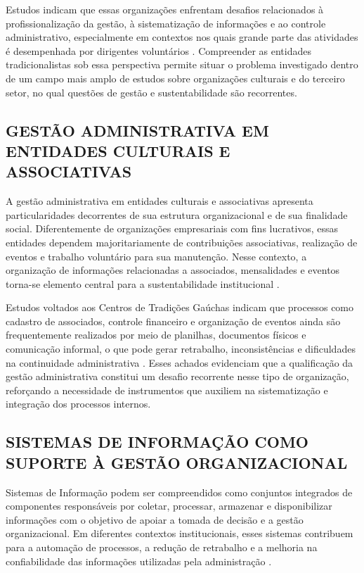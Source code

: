 ﻿\documentclass[12pt,a4paper]{article}
\begin{document}
Estudos indicam que essas organizações enfrentam desafios relacionados à profissionalização da gestão, à sistematização de informações e ao controle administrativo, especialmente em contextos nos quais grande parte das atividades é desempenhada por dirigentes voluntários \citep{fabricio2019,silvaalbarello2024}. Compreender as entidades tradicionalistas sob essa perspectiva permite situar o problema investigado dentro de um campo mais amplo de estudos sobre organizações culturais e do terceiro setor, no qual questões de gestão e sustentabilidade são recorrentes.

\subsection{GESTÃO ADMINISTRATIVA EM ENTIDADES CULTURAIS E ASSOCIATIVAS}

A gestão administrativa em entidades culturais e associativas apresenta particularidades decorrentes de sua estrutura organizacional e de sua finalidade social. Diferentemente de organizações empresariais com fins lucrativos, essas entidades dependem majoritariamente de contribuições associativas, realização de eventos e trabalho voluntário para sua manutenção. Nesse contexto, a organização de informações relacionadas a associados, mensalidades e eventos torna-se elemento central para a sustentabilidade institucional \citep{martini2019}.

Estudos voltados aos Centros de Tradições Gaúchas indicam que processos como cadastro de associados, controle financeiro e organização de eventos ainda são frequentemente realizados por meio de planilhas, documentos físicos e comunicação informal, o que pode gerar retrabalho, inconsistências e dificuldades na continuidade administrativa \citep{jardim2022,silvaalbarello2024}. Esses achados evidenciam que a qualificação da gestão administrativa constitui um desafio recorrente nesse tipo de organização, reforçando a necessidade de instrumentos que auxiliem na sistematização e integração dos processos internos.

\subsection{SISTEMAS DE INFORMAÇÃO COMO SUPORTE À GESTÃO ORGANIZACIONAL}

Sistemas de Informação podem ser compreendidos como conjuntos integrados de componentes responsáveis por coletar, processar, armazenar e disponibilizar informações com o objetivo de apoiar a tomada de decisão e a gestão organizacional. Em diferentes contextos institucionais, esses sistemas contribuem para a automação de processos, a redução de retrabalho e a melhoria na confiabilidade das informações utilizadas pela administração \citep{laudon2014,delone2003}.
\end{document}
